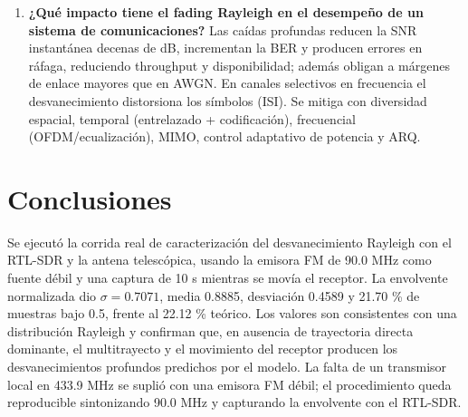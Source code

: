 \documentclass[11pt,a4paper]{article}
\begin{document}
\begin{enumerate}
  \item \textbf{¿Qué impacto tiene el fading Rayleigh en el desempeño de un sistema de comunicaciones?} Las caídas profundas reducen la SNR instantánea decenas de dB, incrementan la BER y producen errores en ráfaga, reduciendo throughput y disponibilidad; además obligan a márgenes de enlace mayores que en AWGN. En canales selectivos en frecuencia el desvanecimiento distorsiona los símbolos (ISI). Se mitiga con diversidad espacial, temporal (entrelazado + codificación), frecuencial (OFDM/ecualización), MIMO, control adaptativo de potencia y ARQ.
\end{enumerate}

\section{Conclusiones}

Se ejecutó la corrida real de caracterización del desvanecimiento Rayleigh con el RTL-SDR y la antena telescópica, usando la emisora FM de 90.0 MHz como fuente débil y una captura de 10 s mientras se movía el receptor. La envolvente normalizada dio $\sigma = 0.7071$, media 0.8885, desviación 0.4589 y 21.70 \% de muestras bajo 0.5, frente al 22.12 \% teórico. Los valores son consistentes con una distribución Rayleigh y confirman que, en ausencia de trayectoria directa dominante, el multitrayecto y el movimiento del receptor producen los desvanecimientos profundos predichos por el modelo. La falta de un transmisor local en 433.9 MHz se suplió con una emisora FM débil; el procedimiento queda reproducible sintonizando 90.0 MHz y capturando la envolvente con el RTL-SDR.
\end{document}
